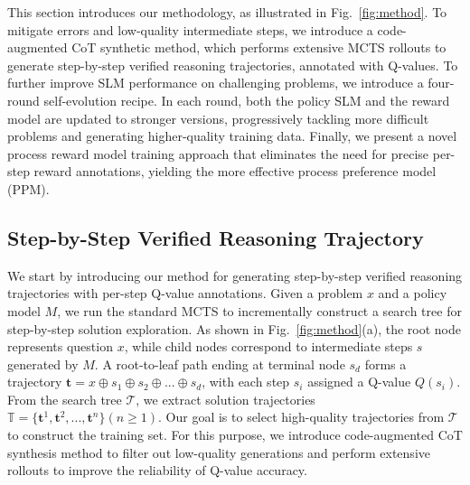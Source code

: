 This section introduces our methodology, as illustrated in Fig.~\ref{fig:method}. To mitigate errors and low-quality intermediate steps, we introduce a code-augmented CoT synthetic method, which performs extensive MCTS rollouts to generate step-by-step verified reasoning trajectories, annotated with   Q-values. To further improve SLM performance on challenging problems, we introduce a four-round self-evolution recipe. In each round, both the policy SLM and the reward model are updated to stronger versions, progressively tackling more difficult problems and generating higher-quality training data. Finally, we present a novel process reward model training approach that eliminates the need for precise per-step reward annotations, yielding the more  
effective process preference model (PPM).






\subsection{Step-by-Step Verified Reasoning Trajectory}
\label{sec:slow thinking}
We start by introducing our method for generating step-by-step verified  reasoning trajectories with per-step Q-value annotations. Given a problem $x$ and a policy model $M$, we run the standard MCTS to incrementally construct a search tree for step-by-step solution exploration. As shown in Fig.~\ref{fig:method}(a), 
the root node represents question $x$, while child nodes correspond to intermediate steps $s$ generated by $M$. A root-to-leaf path ending at  terminal node $s_d$ forms a trajectory $\mathbf{t}=x\oplus s_1\oplus s_2\oplus ...\oplus s_d$, with each step $s_i$  assigned a  Q-value $Q (s_{i})$. 
 From the search tree $\mathcal{T}$, we  extract  solution trajectories $\mathbb{T}=\{\mathbf{t}^1, \mathbf{t}^2, ... , \mathbf{t}^n \} (n\ge1)$. Our goal is to select high-quality trajectories from $\mathcal{T}$ to construct the training set. For this purpose, we introduce code-augmented CoT synthesis method to filter out low-quality generations  and perform extensive rollouts to improve the reliability of Q-value accuracy.




